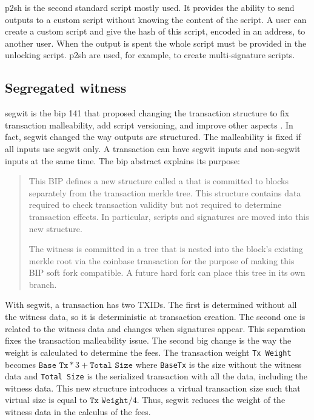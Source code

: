 \gls{p2sh} is the second standard script mostly used. It provides the ability
to send outputs to a custom script without knowing the content of the script.
A user can create a custom script and give the hash of this script, encoded in an address,
to another user. When the output is spent the whole script must be provided in
the unlocking script. \gls{p2sh} are used, for example, to create multi-signature scripts.

\subsection{Segregated witness}

\gls{segwit} is the \gls{bip} 141 that proposed changing the transaction
structure to fix transaction malleability, add script versioning, and improve
other aspects \cite{SegWit, SegWitBIP}. In fact, \gls{segwit} changed the way
outputs are structured. The malleability is fixed if all inputs use \gls{segwit}
only. A transaction can have \gls{segwit} inputs and non-\gls{segwit} inputs at
the same time. The \gls{bip} abstract explains its purpose:

\begin{quote}
  This BIP defines a new structure called a  that is committed to
  blocks separately from the transaction merkle tree. This structure contains
  data required to check transaction validity but not required to determine
  transaction effects. In particular, scripts and signatures are moved into this
  new structure.

  The witness is committed in a tree that is nested into the block's existing
  merkle root via the coinbase transaction for the purpose of making this BIP
  soft fork compatible. A future hard fork can place this tree in its own branch.
\end{quote}

With \gls{segwit}, a transaction has two TXIDs. The first is determined without
all the witness data, so it is deterministic at transaction creation. The
second one is related to the witness data and changes when signatures appear.
This separation fixes the transaction malleability issue. The second big change is the
way the weight is calculated to determine the fees. The transaction weight
\texttt{Tx Weight} becomes $\texttt{Base Tx} * 3 + \texttt{Total Size}$ where
\texttt{BaseTx} is the size without the witness data and \texttt{Total Size} is
the serialized transaction with all the data, including the witness data. This new structure introduces a
virtual transaction size such that virtual size is equal to $\texttt{Tx Weight} /
4$. Thus, \gls{segwit} reduces the weight of the witness data in the calculus of
the fees.

